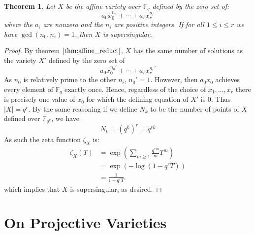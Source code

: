 \documentclass{article}
\newcommand{\F}{\mathbb{F}}
\newtheorem{theorem}{Theorem}[section]
\theoremstyle{definition}
\theoremstyle{definition}
\theoremstyle{remark}
\begin{document}
\begin{theorem} Let $X$ be the affine variety over $\F_q$ defined by the zero set of:
\[a_0x_0^{n_0} + \cdots + a_rx_r^{n_r}\]
where the $a_i$ are nonzero and the $n_i$ are positive integers. If for all $1 \le i \le r$ we have $\gcd(n_0, n_i) = 1$, then $X$ is supersingular.
\end{theorem}
\begin{proof}
By theorem $\ref{thm:affine_reduct}$, $X$ has the same number of solutions as the variety $X'$ defined by the zero set of 
\[a_0x_0^{n_0'} + \cdots + a_rx_r^{n_r'}\]
As $n_0$ is relatively prime to the other $n_i$, $n_0' = 1$. However, then $a_0x_0$ achieves every element of $\F_q$ exactly once. Hence, regardless of the choice of $x_1, \ldots, x_r$ there is precisely one value of $x_0$ for which the defining equation of $X'$ is 0. Thus $|X| = q^r$. By the same reasoning if we define $N_k$ to be the number of points of $X$ defined over $\F_{q^k}$, we have
\[N_k = (q^k)^r = q^{rk}\]
As such the zeta function $\zeta_X$ is:
\begin{align*}
\zeta_X(T) &= \exp\left(\sum_{m \ge 1} \frac{q^{rm}}{m}T^m\right) \\
&= \exp\left(-\log(1 - q^rT)\right)\\
&= \frac{1}{1-q^rT}
\end{align*}
which implies that $X$ is supersingular, as desired.
\end{proof}

\section{On Projective Varieties}
\end{document}
